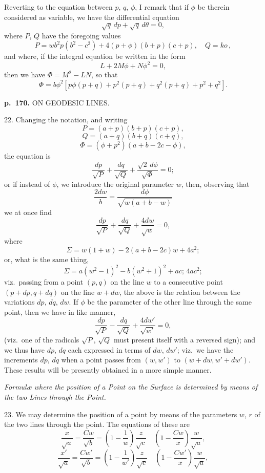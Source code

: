 \documentclass[11pt,a4paper]{book}
\begin{document}
Reverting to the equation between $p$, $q$, $\phi$, I remark that if $\phi$ be therein considered as variable, we have the differential equation
\[
\sqrt{q}\, dp + \sqrt{q}\, d\theta = 0,
\]
where $P$, $Q$ have the foregoing values
\[
P = w b^2 p (b^2 - c^2) + 4(p + \phi)(b + p)(c + p), \quad Q = ko \,,
\]
and where, if the integral equation be written in the form
\[
L + 2M\phi + N\phi^2 = 0,
\]
then we have $\Phi = M^2 - LN$, so that
\[
\Phi = b \phi^2 [p \phi(p + q) + p^2(p + q) + q^2 (p + q) + p^2 + q^2].
\]

\clearpage

\noindent
\textbf{p.~170.}  ON GEODESIC LINES.

22. Changing the notation, and writing
\[
P = (a + p)(b + p)(c + p),
\]
\[
Q = (a + q)(b + q)(c + q),
\]
\[
\Phi = (\phi + p^2)(a + b - 2c - \phi),
\]
the equation is
\[
\frac{dp}{\sqrt{P}} + \frac{dq}{\sqrt{Q}} + \frac{\sqrt{2}\, d\phi}{\sqrt{\Phi}} = 0;
\]
or if instead of $\phi$, we introduce the original parameter $w$, then, observing that
\[
\frac{2dw}{b} = \frac{d\phi}{\sqrt{w(a+b-w)}}
\]
we at once find
\[
\frac{dp}{\sqrt{P}} + \frac{dq}{\sqrt{Q}} + \frac{4dw}{\sqrt{w}} = 0,
\]
where
\[
\Sigma = w(1 + w) - 2(a + b - 2c)w + 4a^2;
\]
or, what is the same thing,
\[
\Sigma = a(w^2 - 1)^2 - b(w^2 + 1)^2 + ac;\, 4ac^2;
\]
viz.\ passing from a point $(p, q)$ on the line $w$ to a consecutive point $(p + dp, q + dq)$
on the line $w + dw$, the above is the relation between the variations $dp$, $dq$, $dw$.  If $\phi$
be the parameter of the other line through the same point, then we have in like manner,
\[
\frac{dp}{\sqrt{P}} - \frac{dq}{\sqrt{Q}} + \frac{4 dw'}{\sqrt{w'}} = 0,
\]
(viz.\ one of the radicals $\sqrt{P}$, $\sqrt{Q}$ must present itself with a reversed sign); and we
thus have $dp$, $dq$ each expressed in terms of $dw$, $dw'$; viz.\ we have the increments
$dp$, $dq$ when a point passes from $(w, w')$ to $(w + dw, w' + dw')$.  These results will be
presently obtained in a more simple manner.

\textit{Formul\ae{} where the position of a Point on the Surface is determined by means of the two Lines through the Point.}

23. We may determine the position of a point by means of the parameters $w$, $r$
of the two lines through the point.  The equations of these are
\[
\frac{x}{\sqrt{a}} = \frac{Cw}{\sqrt{b}} = \left(1 - \frac{1}{w}\right)\frac{z}{\sqrt{c}} \quad \left(1 - \frac{Cw}{x}\right) \frac{w}{\sqrt{a}},
\]
\[
\frac{x'}{\sqrt{a}} = \frac{Cw'}{\sqrt{b}} = \left(1 - \frac{1}{w'}\right)\frac{z}{\sqrt{c}} \quad \left(1 - \frac{Cw'}{x}\right) \frac{w}{\sqrt{a}},
\]
\end{document}
